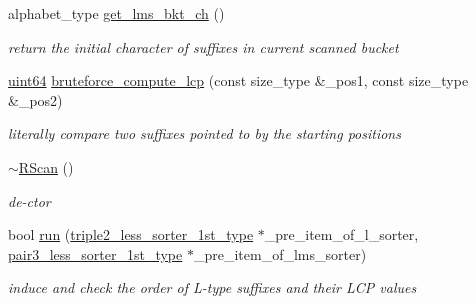 \begin{DoxyCompactItemize}
alphabet\+\_\+type \hyperlink{struct_validate4_1_1_r_scan_ac53c6318e14f774d956baea8134b5937}{get\+\_\+lms\+\_\+bkt\+\_\+ch} ()
\begin{DoxyCompactList}\small\item\em return the initial character of suffixes in current scanned bucket \end{DoxyCompactList}\item 
\hyperlink{types_8h_a60e8696a4678cd348e991a1f172e53f7}{uint64} \hyperlink{struct_validate4_1_1_r_scan_adc3cb04c1da68e1ac8a544c1eaf7c00c}{bruteforce\+\_\+compute\+\_\+lcp} (const size\+\_\+type \&\+\_\+pos1, const size\+\_\+type \&\+\_\+pos2)
\begin{DoxyCompactList}\small\item\em literally compare two suffixes pointed to by the starting positions \end{DoxyCompactList}\item 
\hyperlink{struct_validate4_1_1_r_scan_a853d1a1bbc53a8b1cacf231c0f64bf8a}{$\sim$\+R\+Scan} ()
\begin{DoxyCompactList}\small\item\em de-\/ctor \end{DoxyCompactList}\item 
bool \hyperlink{struct_validate4_1_1_r_scan_a963da6ae9411fca7fb05701dd678161f}{run} (\hyperlink{class_validate4_a4c1bcea817e34f96d95c99e0694bbfc8}{triple2\+\_\+less\+\_\+sorter\+\_\+1st\+\_\+type} $\ast$\+\_\+pre\+\_\+item\+\_\+of\+\_\+l\+\_\+sorter, \hyperlink{class_validate4_aff3135d55f749682df7e0f97c82a6769}{pair3\+\_\+less\+\_\+sorter\+\_\+1st\+\_\+type} $\ast$\+\_\+pre\+\_\+item\+\_\+of\+\_\+lms\+\_\+sorter)
\begin{DoxyCompactList}\small\item\em induce and check the order of L-\/type suffixes and their L\+CP values \end{DoxyCompactList}\end{DoxyCompactItemize}

